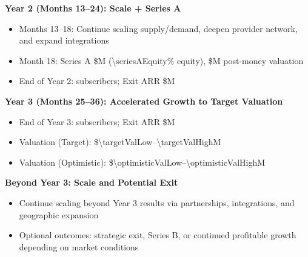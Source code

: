 \textbf{Year 2 (Months 13--24): Scale + Series A}
\begin{itemize}
  \item Months 13--18: Continue scaling supply/demand, deepen provider network, and expand integrations
  \item Month 18: Series A \$M (\num{\seriesAEquity}\% equity), \$M post-money valuation
  \item End of Year 2: \numint{\totalSubsYearTwo} subscribers; Exit ARR \$M
\end{itemize}

\textbf{Year 3 (Months 25--36): Accelerated Growth to Target Valuation}
\begin{itemize}
  \item End of Year 3: \numint{\totalSubsYearThree} subscribers; Exit ARR \$M
  \item Valuation (Target): \$\num{\targetValLow}--\num{\targetValHigh}M
  \item Valuation (Optimistic): \$\num{\optimisticValLow}--\num{\optimisticValHigh}M
\end{itemize}

\textbf{Beyond Year 3: Scale and Potential Exit}
\begin{itemize}
  \item Continue scaling beyond Year 3 results via partnerships, integrations, and geographic expansion
  \item Optional outcomes: strategic exit, Series B, or continued profitable growth depending on market conditions
\end{itemize}
